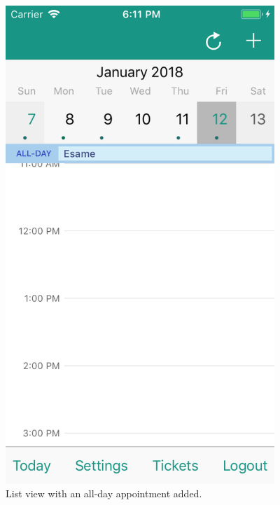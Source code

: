 \begin{figure}
	\centering
	\includegraphics[width=4in]{./screenshots/iOSexemple.png}
	\caption{List view with an all-day appointment added.}
	\label{fig:iosexemple}
\end{figure}

